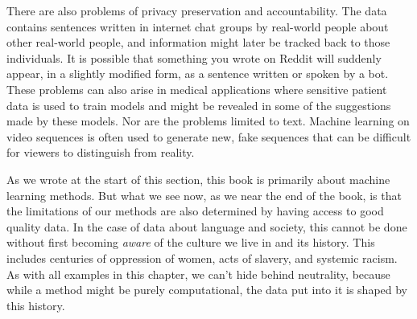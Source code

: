 There are also problems of privacy preservation and accountability. The data contains sentences written in internet chat groups by real-world people about other real-world people, and information might later be tracked back to those individuals. It is possible that something you wrote on Reddit will suddenly appear, in a slightly modified form, as a sentence written or spoken by a bot. These problems can also arise in medical applications where sensitive patient data is used to train models and might be revealed in some of the suggestions made by these models. Nor are the problems limited to text. Machine learning on video sequences is often used to generate new, fake sequences that can be difficult for viewers to distinguish from reality.

As we wrote at the start of this section, this book is primarily about machine learning methods. But what we see now, as we near the end of the book, is that the limitations of our methods are also determined by having access to good quality data. In the case of data about language and society, this cannot be done without first becoming \textit{aware} of the culture we live in and its history. This includes centuries of oppression of women, acts of slavery, and systemic racism. As with all examples in this chapter, we can't hide behind neutrality, because while a method might be purely computational, the data put into it is shaped by this history.



